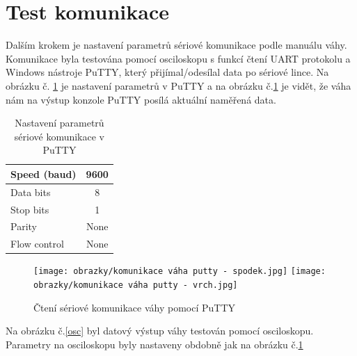 \section{Test komunikace}
Dalším krokem je nastavení parametrů sériové komunikace podle manuálu váhy\cite{vaha_datasheed}. Komunikace byla testována pomocí osciloskopu s funkcí čtení UART protokolu a Windows nástroje PuTTY, který přijímal/odesílal data po sériové lince. 
Na obrázku č. \ref{putty} je nastavení parametrů v PuTTY a na obrázku č.\ref{puttyyyy} je vidět, že váha nám na výstup konzole PuTTY posílá aktuální naměřená data.

\begin{table}[h]
    \centering
    \begin{tabular}{|l|c|}
        \hline
        Speed (baud)     & 9600 \\ \hline
        Data bits        & 8    \\ \hline
        Stop bits        & 1    \\ \hline
        Parity           & None \\ \hline
        Flow control     & None \\ \hline
    \end{tabular}
    \caption{Nastavení parametrů sériové komunikace v PuTTY}
    \label{putty}
\end{table}



\begin{figure}[H]
    \begin{center}
        \texttt{[image: obrazky/komunikace váha putty - spodek.jpg]}
        \texttt{[image: obrazky/komunikace váha putty - vrch.jpg]}
    \end{center}
    \caption{Čtení sériové komunikace váhy pomocí PuTTY}
    \label{puttyyyy}
\end{figure}

Na obrázku č.\ref{osc} byl datový výstup váhy testován pomocí osciloskopu. Parametry na osciloskopu byly nastaveny obdobně jak na obrázku č.\ref{putty}

